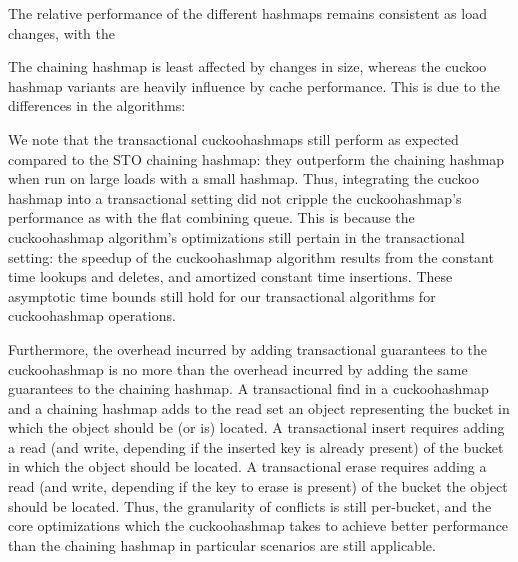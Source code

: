 The relative performance of the different hashmaps remains consistent as load changes, with the 

The chaining hashmap is least affected by changes in size, whereas the cuckoo hashmap variants are heavily influence by cache performance. This is due to the differences in the algorithms: 

We note that the transactional cuckoohashmaps still perform as expected compared to the STO chaining hashmap: they outperform the chaining hashmap when run on large loads with a small hashmap. Thus, integrating the cuckoo hashmap into a transactional setting did not cripple the cuckoohashmap's performance as with the flat combining queue. This is because the cuckoohashmap algorithm's optimizations still pertain in the transactional setting: the speedup of the cuckoohashmap algorithm results from the constant time lookups and deletes, and amortized constant time insertions. These asymptotic time bounds still hold for our transactional algorithms for cuckoohashmap operations.

Furthermore, the overhead incurred by adding transactional guarantees to the cuckoohashmap is no more than the overhead incurred by adding the same guarantees to the chaining hashmap. A transactional find in a cuckoohashmap and a chaining hashmap adds to the read set an object representing the bucket in which the object should be (or is) located.  A transactional insert requires adding a read (and write, depending if the inserted key is already present) of the bucket in which the object should be located. A transactional erase requires adding a read (and write, depending if the key to erase is present) of the bucket the object should be located. Thus, the granularity of conflicts is still per-bucket, and the core optimizations which the cuckoohashmap takes to achieve better performance than the chaining hashmap in particular scenarios are still applicable.

